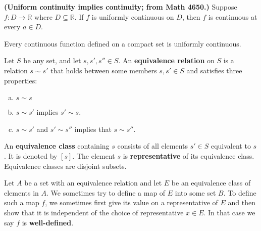 \begin{theorem} \textbf{(Uniform continuity implies continuity; from Math 4650.)} Suppose \(f:D \to \mathbb{R}\) where \(D \subseteq \mathbb{R}\). If \(f\) is uniformly continuous on \(D\), then \(f\) is continuous at every \(a \in D\).

\end{theorem}

\begin{theorem}

Every continuous function defined on a compact set is uniformly continuous.

\end{theorem}

\begin{definition}\label{ra.def.equiv}

Let \(S\) be any set, and let \(s, s', s'' \in S\). An \textbf{equivalence relation} on \(S\) is a relation \(s \sim s'\) that holds between some members \(s, s' \in S\) and satisfies three properties:

\begin{enumerate}[(a)]

\item \(s \sim s\)

\item \(s \sim s'\) implies \(s' \sim s\).

\item \(s \sim s'\) and \(s' \sim s''\) implies that \(s \sim s''\).

\end{enumerate}

An \textbf{equivalence class} containing \(s\) consists of all elements \(s' \in S\) equivalent to \(s\). It is denoted by \([s]\). The element \(s\) is \textbf{representative} of its equivalence class. Equivalence classes are disjoint subsets.

\end{definition}

\begin{definition}

Let \(A\) be a set with an equivalence relation and let \(E\) be an equivalence class of elements in \(A\). We sometimes try to define a map of \(E\) into some set \(B\). To define such a map \(f\), we sometimes first give its value on a representative of \(E\) and then show that it is independent of the choice of representative \(x \in E\). In that case we say \(f\) is \textbf{well-defined}.

\end{definition}

